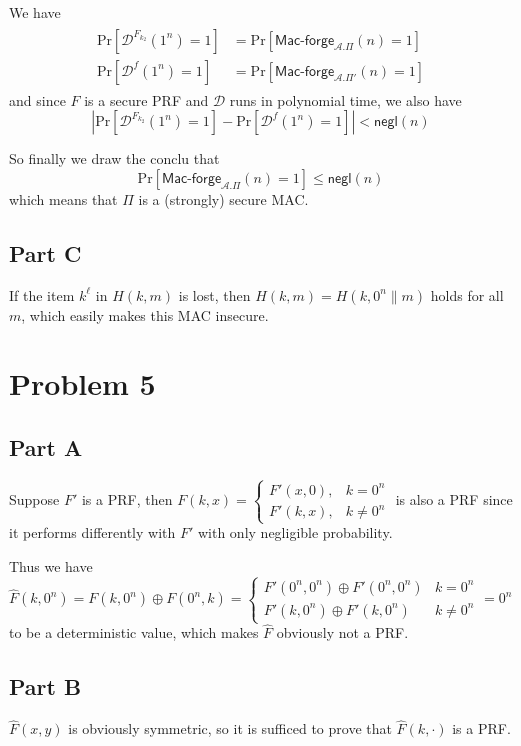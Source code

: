 \documentclass[8pt]{article}
\theoremstyle{compact}
\def\le{\leqslant}
\begin{document}
We have \begin{align*}
	\begin{split}
		\text{Pr}\left[\mathcal D^{F_{k_2}}(1^n)=1\right] &= \text{Pr}\left[\textsf{Mac-forge}_{\mathcal A. \Pi}(n) = 1\right] \\
		\text{Pr}\left[\mathcal D^{f}(1^n)=1\right] &= \text{Pr}\left[\textsf{Mac-forge}_{\mathcal A. \Pi'}(n) = 1\right]
	\end{split}
\end{align*}
and since $F$ is a secure PRF and $\mathcal D$ runs in polynomial time, we also have $$\left| \text{Pr}\left[\mathcal D^{F_{k_2}}(1^n)=1\right] - \text{Pr}\left[\mathcal D^{f}(1^n)=1\right] \right| < \textsf{negl}(n)$$

So finally we draw the conclu that $$ \text{Pr}\left[\textsf{Mac-forge}_{\mathcal A. \Pi}(n) = 1\right] \le \textsf{negl}(n)$$
which means that $\Pi$ is a (strongly) secure MAC.

\subsection*{Part C}

If the item $k^{\ell}$ in $H(k, m)$ is lost, then $H(k, m) = H(k, 0^n \| m)$ holds for all $m$, which easily makes this MAC insecure.

\section*{Problem 5}
\subsection*{Part A}
Suppose $F'$ is a PRF, then $F(k, x) = \begin{cases}
	F'(x, 0), & k = 0^n \\
	F'(k, x), & k \neq 0^n
\end{cases}$ is also a PRF since it performs differently with $F'$ with only negligible probability.

Thus we have $\hat{F}(k, 0^n) = F(k, 0^n) \oplus F(0^n, k) = \begin{cases}
	F'(0^n, 0^n) \oplus F'(0^n, 0^n) & k = 0^n \\
	F'(k, 0^n) \oplus F'(k, 0^n) & k \neq 0^n
\end{cases} = 0^n$ to be a deterministic value, which makes $\hat{F}$ obviously not a PRF.
\subsection*{Part B}
$\hat{F}(x, y)$ is obviously symmetric, so it is sufficed to prove that $\hat{F}(k, \cdot)$ is a PRF.
\end{document}

